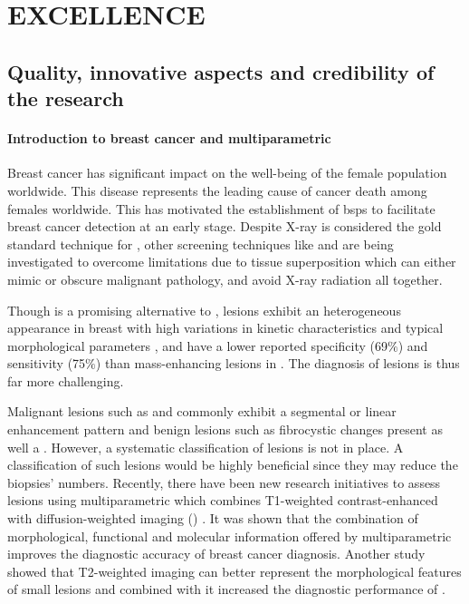 \section{EXCELLENCE}
\label{sec:excellence}


\subsection{Quality, innovative aspects and credibility of the research}
\label{sec:quality}

\paragraph{Introduction to breast cancer and multiparametric \mri}
Breast cancer has significant impact on the well-being of the female population
worldwide. This disease represents the leading cause of cancer death among
females worldwide\cite{cancerStatistics2011}.  This has motivated the
establishment of \acp{bsp} to facilitate breast cancer detection at an early
stage. Despite X-ray \dm is considered the gold standard technique for \bsp,
other screening techniques like \us and \mri are being investigated to overcome
\dm limitations due to tissue superposition which can either mimic or obscure
malignant pathology, and avoid X-ray radiation all together.

Though \mri is a promising alternative to \dm, \nmle lesions exhibit an
heterogeneous appearance in breast \mri with high variations in kinetic
characteristics and typical morphological parameters
\cite{rosen2007birads,skamato2008categorization,yabuuchi2010nmle}, and have
a lower reported specificity (69$\%$) and sensitivity (75$\%$) than
mass-enhancing lesions \cite{Vag} in \cemri. The diagnosis of \nmle lesions is thus far more challenging.

Malignant lesions such as \dcis and \ilc commonly exhibit a segmental or
linear enhancement pattern and benign lesions such as fibrocystic
changes present as well a \nmle \cite{Vag}.
However, a systematic classification of \nmle
lesions is not in place. A classification of such lesions would be
highly beneficial since they may reduce the biopsies' numbers.
   Recently, there
have been new research initiatives to assess \nmle lesions using
multiparametric \mri which combines
T1-weighted contrast-enhanced \mri with diffusion-weighted imaging
(\dwi) \cite{Pinker1,yabuuchi2010nmle}. It was shown that the combination of
morphological, functional and molecular information offered by
multiparametric \mri improves the diagnostic accuracy  of breast
cancer diagnosis. Another study showed that T2-weighted imaging can
better represent the morphological features of small lesions \cite{Wu1}
and combined with \dwi it increased the diagnostic performance of \mri.

